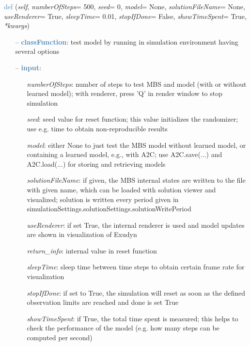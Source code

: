 \begin{itemize}[leftmargin=1.4cm]
\begin{itemize}[leftmargin=1.4cm]
\begin{flushleft}
\noindent \textcolor{steelblue}{def {\bf {}}}\label{sec:artificialIntelligence:OpenAIGymInterfaceEnv(Env):TestModel}
({\it self}, {\it numberOfSteps}= 500, {\it seed}= 0, {\it model}= None, {\it solutionFileName}= None, {\it useRenderer}= True, {\it sleepTime}= 0.01, {\it stopIfDone}= False, {\it showTimeSpent}= True, {\it **kwargs})
\end{flushleft}
\setlength{\itemindent}{0.7cm}
\begin{itemize}[leftmargin=0.7cm]
\item[--]\textcolor{steelblue}{\bf classFunction}: test model by running in simulation environment having several options
\item[--]\textcolor{steelblue}{\bf input}: \vspace{-6pt}
\begin{itemize}[leftmargin=1.2cm]
\setlength{\itemindent}{-0.7cm}
\item[]{\it numberOfSteps}: number of steps to test MBS and model (with or without learned model); with renderer, press 'Q' in render window to stop simulation
\item[]{\it seed}: seed value for reset function; this value initializes the randomizer; use e.g. time to obtain non-reproducible results
\item[]{\it model}: either None to just test the MBS model without learned model, or containing a learned model, e.g., with A2C; use A2C.save(...) and A2C.load(...) for storing and retrieving models
\item[]{\it solutionFileName}: if given, the MBS internal states are written to the file with given name, which can be loaded with solution viewer and visualized; solution is written every period given in simulationSettings.solutionSettings.solutionWritePeriod
\item[]{\it useRenderer}: if set True, the internal renderer is used and model updates are shown in visualization of Exudyn
\item[]{\it return\_info}: internal value in reset function
\item[]{\it sleepTime}: sleep time between time steps to obtain certain frame rate for visualization
\item[]{\it stopIfDone}: if set to True, the simulation will reset as soon as the defined observation limits are reached and done is set True
\item[]{\it showTimeSpent}: if True, the total time spent is measured; this helps to check the performance of the model (e.g. how many steps can be computed per second)

\end{itemize}
\end{itemize}
\end{itemize}
\end{itemize}
